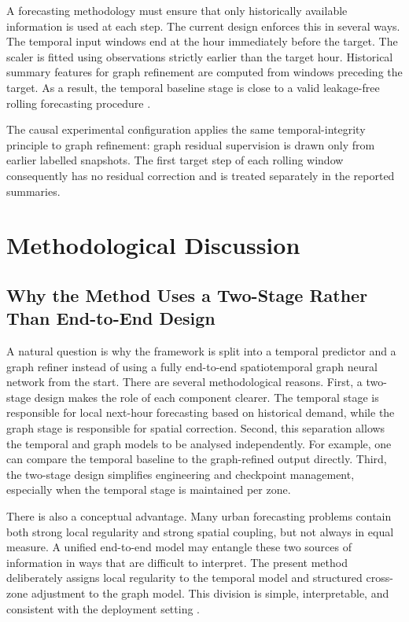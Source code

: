 \documentclass[12pt,a4paper]{report}
\begin{document}
A forecasting methodology must ensure that only historically available information is used at each step. The current design enforces this in several ways. The temporal input windows end at the hour immediately before the target. The scaler is fitted using observations strictly earlier than the target hour. Historical summary features for graph refinement are computed from windows preceding the target. As a result, the temporal baseline stage is close to a valid leakage-free rolling forecasting procedure \cite{hewamalage2022pitfalls,cerqueira2020evaluating}.

The causal experimental configuration applies the same temporal-integrity principle to graph refinement: graph residual supervision is drawn only from earlier labelled snapshots. The first target step of each rolling window consequently has no residual correction and is treated separately in the reported summaries.

\section{Methodological Discussion}
\label{sec:methodological-discussion}

\subsection{Why the Method Uses a Two-Stage Rather Than End-to-End Design}

A natural question is why the framework is split into a temporal predictor and a graph refiner instead of using a fully end-to-end spatiotemporal graph neural network from the start. There are several methodological reasons. First, a two-stage design makes the role of each component clearer. The temporal stage is responsible for local next-hour forecasting based on historical demand, while the graph stage is responsible for spatial correction. Second, this separation allows the temporal and graph models to be analysed independently. For example, one can compare the temporal baseline to the graph-refined output directly. Third, the two-stage design simplifies engineering and checkpoint management, especially when the temporal stage is maintained per zone.

There is also a conceptual advantage. Many urban forecasting problems contain both strong local regularity and strong spatial coupling, but not always in equal measure. A unified end-to-end model may entangle these two sources of information in ways that are difficult to interpret. The present method deliberately assigns local regularity to the temporal model and structured cross-zone adjustment to the graph model. This division is simple, interpretable, and consistent with the deployment setting \cite{garcia2023explainability,shao2022d2stgnn}.
\end{document}
